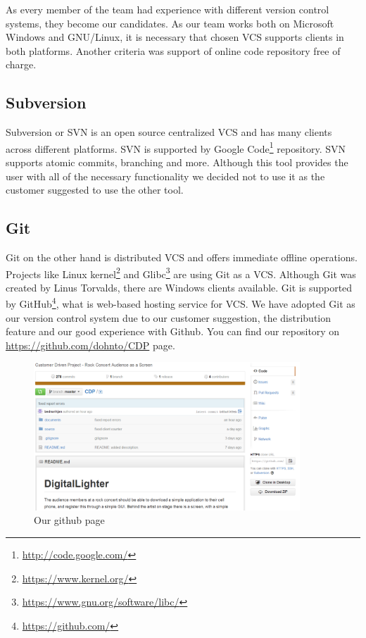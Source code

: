 As every member of the team had experience with different version control systems, they become our candidates. As our team works both on Microsoft Windows and GNU/Linux, it is necessary that chosen VCS supports clients in both platforms. Another criteria was support of online code repository free of charge.


\subsection{Subversion}
Subversion or SVN is an open source centralized VCS and has many clients across different platforms. 
SVN is supported by Google Code\footnote{\url{http://code.google.com/}} repository.
SVN supports atomic commits, branching and more. Although this tool provides the user with all of the necessary functionality we decided not to use it as the customer suggested to use the other tool.


\subsection{Git}
Git on the other hand is distributed VCS and offers immediate offline operations.
Projects like Linux kernel\footnote{\url{https://www.kernel.org/}} and Glibc\footnote{\url{https://www.gnu.org/software/libc/}} are using Git as a VCS.
Although Git was created by Linus Torvalds, there are Windows clients available.
Git is supported by GitHub\footnote{\url{https://github.com/}}, what is web-based hosting service for VCS. We have adopted Git as our version control system due to our customer suggestion, the distribution feature and our good experience with Github.
You can find our repository on \url{https://github.com/dohnto/CDP} page.

\begin{figure}[!t]
	\centering
		\includegraphics[width=10cm]{preliminaryStudies/git.png}
	\caption{Our github page}
	\label{img:git}
\end{figure}


